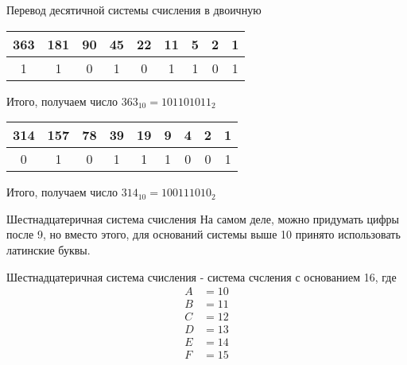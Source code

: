 \documentclass[hyperref=unicode, aspectratio=169]{beamer}
\begin{document}
\begin{frame}{Перевод десятичной системы счисления в двоичную}
    \begin{example}
        \begin{table}
            \begin{tabular}{| c | c | c | c | c | c | c | c | c |}
                \hline
                363 & 181 & 90 & 45 & 22 & 11 & 5 & 2 & 1 \\
                \hline
                1   & 1   & 0  & 1  & 0  & 1  & 1 & 0 & 1 \\
                \hline
            \end{tabular}
        \end{table}
        Итого, получаем число $363_{10} = 101101011_{2}$
    \end{example}
    \begin{example}
        \begin{table}
            \begin{tabular}{|c | c | c | c | c | c | c | c | c |}
                \hline
                314 & 157 & 78 & 39 & 19 & 9 & 4 & 2 & 1 \\
                \hline
                0   & 1   & 0  & 1  & 1  & 1 & 0 & 0 & 1 \\
                \hline
            \end{tabular}
        \end{table}
        Итого, получаем число $314_{10} = 100111010_{2}$
    \end{example}
\end{frame}

\begin{frame}{Шестнадцатеричная система счисления}
    На самом деле, можно придумать цифры после 9, но вместо этого, для оснований системы выше 10 принято использовать латинские буквы.
    \begin{definition}
        Шестнадцатеричная система счисления - система счсления с основанием 16, где
        \begin{align*}
            A & = 10 \\
            B & = 11 \\
            C & = 12 \\
            D & = 13 \\
            E & = 14 \\
            F & = 15 \\
        \end{align*}
    \end{definition}
\end{frame}
\end{document}
